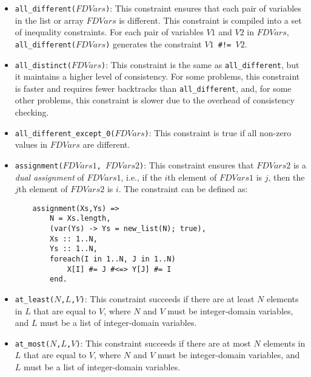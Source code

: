 \begin{itemize}
\item \texttt{all\_different($FDVars$)}: This constraint ensures that each pair of variables in the list or array $FDVars$ is different. This constraint is compiled into a set of inequality constraints. For each pair of variables $V1$ and $V2$ in $FDVars$, \texttt{all\_different($FDVars$)} generates the constraint {\tt $V1$ \verb+#!=+ $V2$}.

\item \texttt{all\_distinct($FDVars$)}: This constraint is the same as \texttt{all\_different}, but it maintains a higher level of consistency. For some problems, this constraint is faster and requires fewer backtracks than \texttt{all\_different}, and, for some other problems, this constraint is slower due to the overhead of consistency checking.

\item \texttt{all\_different\_except\_0($FDVars$)}: This constraint is true if all non-zero values in $FDVars$ are different.
\item \texttt{assignment($FDVars1$, $FDVars2$)}: This constraint ensures that $FDVars2$ is a \emph{dual assignment} of $FDVars1$, i.e., if the $i$th element of $FDVars1$ is $j$, then the $j$th element of $FDVars2$ is $i$. The constraint can be defined as:
\begin{verbatim}
    assignment(Xs,Ys) =>
        N = Xs.length,
        (var(Ys) -> Ys = new_list(N); true),
        Xs :: 1..N,
        Ys :: 1..N,
        foreach(I in 1..N, J in 1..N)
            X[I] #= J #<=> Y[J] #= I
        end.
\end{verbatim}

\item \texttt{at\_least($N$,$L$,$V$)}: This constraint succeeds if there are at least $N$ elements in $L$ that are equal to $V$, where $N$ and $V$ must be integer-domain variables, and $L$ must be a list of integer-domain variables.

\item \texttt{at\_most($N$,$L$,$V$)}: This constraint succeeds if there are at most $N$ elements in $L$ that are equal to $V$, where $N$ and $V$ must be integer-domain variables, and $L$ must be a list of integer-domain variables.


\end{itemize}
